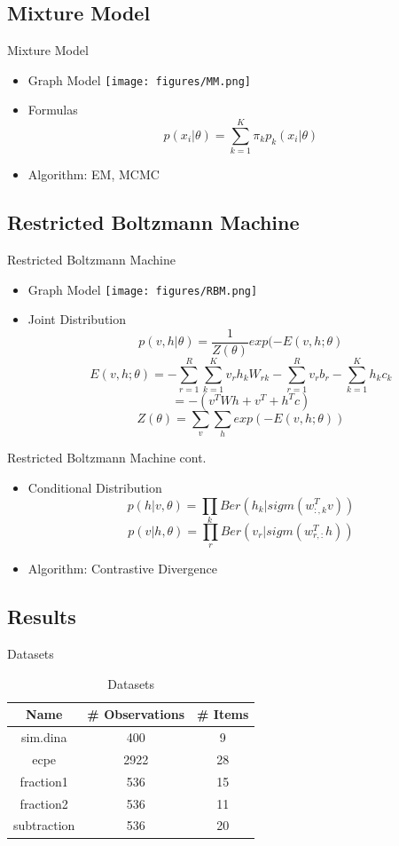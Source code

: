 \documentclass[handout]{beamer}
\begin{document}
\subsection[MM]{Mixture Model}
\begin{frame}{Mixture Model}
\begin{itemize}
\item{Graph Model}
\texttt{[image: figures/MM.png]}
\item{Formulas}
$$p(x_i|\theta)=\sum\limits_{k=1}^K\pi_kp_k(x_i|\theta)$$
\item{Algorithm: EM, MCMC}
\end{itemize}
\end{frame}

\subsection[RBM]{Restricted Boltzmann Machine}
\begin{frame}{Restricted Boltzmann Machine}
\begin{itemize}
\item{Graph Model}
\texttt{[image: figures/RBM.png]}
\item{Joint Distribution}
$$ p(v,h|\theta) = \frac{1}{Z(\theta)}exp(-E(v,h;\theta)$$
$$ E(v,h;\theta) = -\sum\limits_{r=1}^R\sum\limits_{k=1}^Kv_rh_kW_{rk}-\sum\limits_{r=1}^Rv_rb_r-\sum\limits_{k=1}^Kh_kc_k $$
$$ = - (v^TWh+v^T+h^Tc)$$
$$ Z(\theta)=\sum\limits_{v}\sum\limits_{h}exp(-E(v,h;\theta))$$
\end{itemize}
\end{frame}

\begin{frame}{Restricted Boltzmann Machine cont.}
\begin{itemize}
\item{Conditional Distribution}
$$ p(h|v,\theta)=\prod\limits_{k}Ber(h_k|sigm(w_{:,k}^Tv))$$
$$ p(v|h,\theta)=\prod\limits_{r}Ber(v_r|sigm(w_{r,:}^Th))$$
\item{Algorithm: Contrastive Divergence}
\end{itemize}
\end{frame}

\subsection[Results]{Results}
\begin{frame}{Datasets}
\begin{table}[!h]
\begin{center}
\begin{tabular}{|c|c|c|}
\hline
Name & \# Observations & \# Items \\
\hline
sim.dina & 400 & 9 \\
\hline
ecpe & 2922 & 28 \\
\hline
fraction1 & 536 & 15 \\
\hline
fraction2 & 536 & 11 \\
\hline
subtraction & 536 & 20 \\
\hline
\end{tabular}
\end{center}
\caption{Datasets}\label{tab:datasets}
\end{table}
\end{frame}
\end{document}
